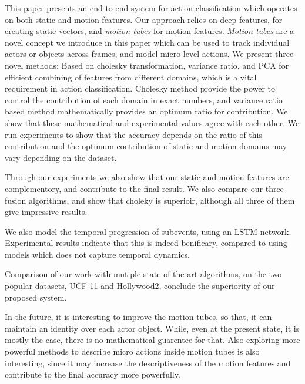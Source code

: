 This paper presents an end to end system for action classification which operates 
on both static and motion features. Our approach relies on deep features,
for creating static vectors, and \textit{motion tubes} for motion features. 
\textit{Motion tubes} are a novel concept we introduce in this paper which can be
used to track individual actors or objects across frames, and model micro level actions. 
We present three novel methods: Based on cholesky transformation, variance ratio, and PCA for efficient combining of features 
from different domains, which is a vital requirement in action classification.
Cholesky method provide the power to control the contribution of each domain in exact numbers, and
variance ratio based method mathematically provides an optimum ratio for contribution. We show that these mathematical 
and experimental values agree with each other.
We run experiments to show that the accuracy depends on the ratio of this contribution and the optimum contribution of 
static and motion domains may vary depending on the dataset. 

Through our experiments we also show that our static and motion features are complementory,
and contribute to the final result. We also compare our three fusion algorithms, and 
show that choleky is superioir, although all three of them give impressive results. 


We also model the temporal progression of subevents, using an LSTM network. Experimental 
results indicate that this is indeed benificary, compared to using models which does not capture temporal dynamics. 

Comparison of our work with mutiple state-of-the-art algorithms, on the 
two popular datasets, UCF-11 and Hollywood2, conclude the superiority of our proposed system.

In the future, it is interesting to improve the motion tubes, so that, it can maintain an identity over each actor object.
While, even at the present state, it is mostly the case, there is no mathematical guarentee for that. 
Also exploring more powerful methods to describe micro actions inside motion tubes is also interesting, since it may increase the descriptiveness of the motion features and
contribute to the final accuracy more powerfully. 
